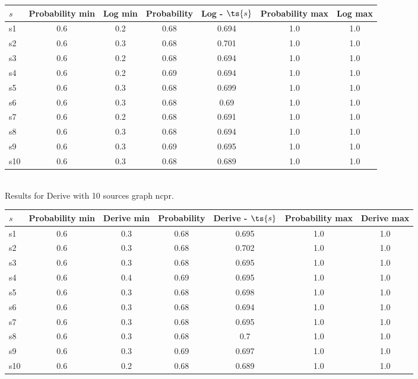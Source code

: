 \documentclass{article}
\begin{document}
\noindent\begin{tabular}{|l|c|c|c|c|c|c|}
\hline
$s$& Probability min & Log min & Probability & Log - $\ts{s}$ & Probability max & Log max\\
\hline
s1 &0.6 & 0.2 & 0.68 & 0.694 & 1.0 & 1.0\\
\hline
s2 &0.6 & 0.3 & 0.68 & 0.701 & 1.0 & 1.0\\
\hline
s3 &0.6 & 0.2 & 0.68 & 0.694 & 1.0 & 1.0\\
\hline
s4 &0.6 & 0.2 & 0.69 & 0.694 & 1.0 & 1.0\\
\hline
s5 &0.6 & 0.3 & 0.68 & 0.699 & 1.0 & 1.0\\
\hline
s6 &0.6 & 0.3 & 0.68 & 0.69 & 1.0 & 1.0\\
\hline
s7 &0.6 & 0.2 & 0.68 & 0.691 & 1.0 & 1.0\\
\hline
s8 &0.6 & 0.3 & 0.68 & 0.694 & 1.0 & 1.0\\
\hline
s9 &0.6 & 0.3 & 0.69 & 0.695 & 1.0 & 1.0\\
\hline
s10 &0.6 & 0.3 & 0.68 & 0.689 & 1.0 & 1.0\\
\hline
\end{tabular}\\

\noindent Results for Derive with 10 sources graph ncpr.

\noindent\begin{tabular}{|l|c|c|c|c|c|c|}
\hline
$s$& Probability min & Derive min & Probability & Derive - $\ts{s}$ & Probability max & Derive max\\
\hline
s1 &0.6 & 0.3 & 0.68 & 0.695 & 1.0 & 1.0\\
\hline
s2 &0.6 & 0.3 & 0.68 & 0.702 & 1.0 & 1.0\\
\hline
s3 &0.6 & 0.3 & 0.68 & 0.695 & 1.0 & 1.0\\
\hline
s4 &0.6 & 0.4 & 0.69 & 0.695 & 1.0 & 1.0\\
\hline
s5 &0.6 & 0.3 & 0.68 & 0.698 & 1.0 & 1.0\\
\hline
s6 &0.6 & 0.3 & 0.68 & 0.694 & 1.0 & 1.0\\
\hline
s7 &0.6 & 0.3 & 0.68 & 0.695 & 1.0 & 1.0\\
\hline
s8 &0.6 & 0.3 & 0.68 & 0.7 & 1.0 & 1.0\\
\hline
s9 &0.6 & 0.3 & 0.69 & 0.697 & 1.0 & 1.0\\
\hline
s10 &0.6 & 0.2 & 0.68 & 0.689 & 1.0 & 1.0\\
\hline
\end{tabular}\\
\end{document}
